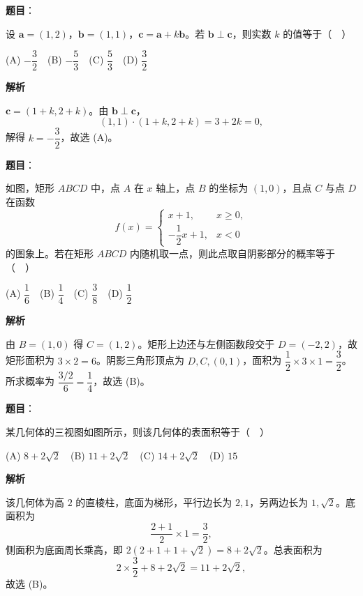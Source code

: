 \begin{answer}

\textbf{题目}：

设 \(\boldsymbol a=(1,2)\)，\(\boldsymbol b=(1,1)\)，\(\boldsymbol c=\boldsymbol a+k\boldsymbol b\)。若 \(\boldsymbol b\perp\boldsymbol c\)，则实数 \(k\) 的值等于（　）

(A) \(-\dfrac32\)　(B) \(-\dfrac53\)　(C) \(\dfrac53\)　(D) \(\dfrac32\)

\textbf{解析}

\(\boldsymbol c=(1+k,2+k)\)。由 \(\boldsymbol b\perp\boldsymbol c\)，
\nopagebreak[4]
\[
(1,1)\cdot(1+k,2+k)=3+2k=0,
\]
解得 \(k=-\dfrac32\)，故选 (A)。


\end{answer}
\begin{answer}

\textbf{题目}：

如图，矩形 \(ABCD\) 中，点 \(A\) 在 \(x\) 轴上，点 \(B\) 的坐标为 \((1,0)\)，且点 \(C\) 与点 \(D\) 在函数
\nopagebreak[4]
\[
f(x)=\begin{cases}
x+1,&x\geqslant0,\\
-\dfrac12x+1,&x<0
\end{cases}
\]
的图象上。若在矩形 \(ABCD\) 内随机取一点，则此点取自阴影部分的概率等于（　）

(A) \(\dfrac16\)　(B) \(\dfrac14\)　(C) \(\dfrac38\)　(D) \(\dfrac12\)
\nopagebreak[4]
\begin{center}\end{center}
\nopagebreak[4]
\textbf{解析}

由 \(B=(1,0)\) 得 \(C=(1,2)\)。矩形上边还与左侧函数段交于 \(D=(-2,2)\)，故矩形面积为 \(3\times2=6\)。阴影三角形顶点为 \(D,C,(0,1)\)，面积为 \(\dfrac12\times3\times1=\dfrac32\)。所求概率为 \(\dfrac{3/2}{6}=\dfrac14\)，故选 (B)。


\end{answer}
\begin{answer}

\textbf{题目}：

某几何体的三视图如图所示，则该几何体的表面积等于（　）

(A) \(8+2\sqrt2\)　(B) \(11+2\sqrt2\)　(C) \(14+2\sqrt2\)　(D) \(15\)
\nopagebreak[4]
\begin{center}\end{center}
\nopagebreak[4]
\textbf{解析}

该几何体为高 \(2\) 的直棱柱，底面为梯形，平行边长为 \(2,1\)，另两边长为 \(1,\sqrt2\)。底面积为
\nopagebreak[4]
\[
\frac{2+1}{2}\times1=\frac32,
\]
侧面积为底面周长乘高，即 \(2(2+1+1+\sqrt2)=8+2\sqrt2\)。总表面积为
\nopagebreak[4]
\[
2\times\frac32+8+2\sqrt2=11+2\sqrt2,
\]
故选 (B)。


\end{answer}
